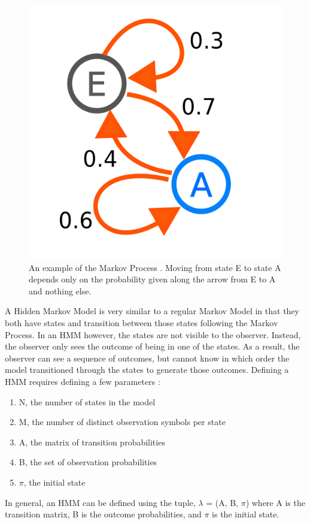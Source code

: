 \documentclass[letterpaper, 11pt]{article}%
\begin{document}
\begin{figure}
  \centering
  \includegraphics[scale=0.2]{process}
  \caption[Markov Process]
  {An example of the Markov Process \cite{markov}. Moving from state E to state A depends only on the probability given along the arrow from E to A and nothing else. }
\end{figure}

A Hidden Markov Model is very similar to a regular Markov Model in that they both have states and transition between those states following the Markov Process. In an HMM however, the states are not visible to the observer. Instead, the observer only sees the outcome of being in one of the states. As a result, the observer can see a sequence of outcomes, but cannot know in which order the model transitioned through the states to generate those outcomes.
Defining a HMM requires defining a few parameters \cite{Rabiner}:
\begin{enumerate}
  \item
  N, the number of states in the model
  \item
  M, the number of distinct observation symbols per state
  \item
  A, the matrix of transition probabilities
  \item
  B, the set of observation probabilities
  \item
  $\pi$, the initial state
\end{enumerate}
In general, an HMM can be defined using the tuple, $\lambda$ = (A, B, $\pi$) where A is the transition matrix, B is the outcome probabilities, and $\pi$ is the initial state.
\end{document}
